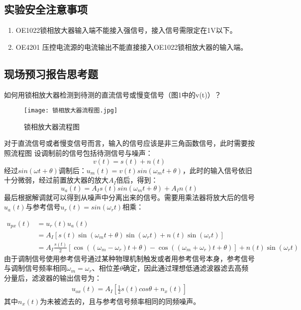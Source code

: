 \documentclass[dvipsnames, svgnames,a4paper,11pt]{article}
\begin{document}
\subsection{实验安全注意事项}
\begin{enumerate}
	\item OE1022锁相放大器输入端不能接入强信号，接入信号需限定在1V以下。
	\item OE4201 压控电流源的电流输出不能直接接入OE1022锁相放大器的输入端。
\end{enumerate}

\clearpage
\subsection{现场预习报告思考题}
	\begin{question}
		如何用锁相放大器检测到待测的直流信号或慢变信号（图1中的v(t)）？ 
	\end{question}

		
	\begin{figure}[htbp]
		\centering
		\texttt{[image: 锁相放大器流程图.jpg]}
		\caption{锁相放大器流程图}
		\label{fig:锁相放大器流程图}
	\end{figure}
	对于直流信号或者慢变信号而言，输入的信号应该是非三角函数信号，此时需要按照流程图
	设调制前的信号包括待测信号与噪声：
	\begin{equation}
	v(t) = s(t) +n(t)
	\label{eq:1}
	\end{equation}
	经过$sin(\omega t + \theta)$调制后：$u_m(t) = v(t)sin(\omega _m t +\theta)$，此时的输入信号依旧十分微弱，经过前置放大器的放大$A_I$倍后，得到：
	$$
	u_a(t) = A_Is(t)	sin(\omega _m t +\theta)+A_I n(t)
	$$
	最后根据解调就可以得到从噪声中分离出来的信号。需要用乘法器将放大后的信号$u_a(t)$与参考信号$u_r(t)=sin(\omega _rt)$相乘：


	\begin{align}
		u_{px}(t) &= u_r(t)u_a(t) \nonumber \\
				  &= A_I[s(t)\sin(\omega_m t + \theta)\sin(\omega_r t) + n(t)\sin(\omega_r t)] \nonumber \\
				  &= A_I { \frac{s(t)}{2} \left[ \cos((\omega_m - \omega_r)t + \theta) - \cos((\omega_m + \omega_r)t + \theta) \right] + n(t)\sin(\omega_r t) } \label{eq:2}
	\end{align}
	由于调制信号使用参考信号通过某种物理机制触发或者用参考信号本身，参考信号与调制信号频率相同$\omega _m=\omega_r$、相位差$\theta$确定，因此通过理想低通滤波器滤去高频分量后，滤波器的输出信号为：
	\begin{align}
		u_{ox}(t)=A_I [ \frac{1}{2} s(t) cos\theta +n_x(t)] \label{eq:3}
	\end{align}
	其中$n_x(t)$为未被滤去的，且与参考信号频率相同的同频噪声。
\end{document}
